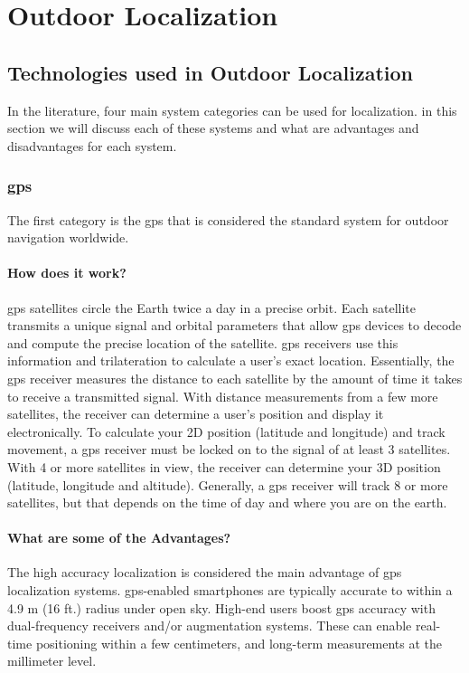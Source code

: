 \chapter{Outdoor Localization}

\section{Technologies used in Outdoor Localization}
In the literature, four main system categories can be used for localization.
in this section we will discuss each of these systems and what are advantages and disadvantages for each system.

\subsection{\ac{gps}}
The first category is the \ac{gps} that is considered the standard system for outdoor navigation worldwide.\cite{6295661}

\subsubsection{How does it work?}
\ac{gps} satellites circle the Earth twice a day in a precise orbit.
Each satellite transmits a unique signal and orbital parameters that allow \ac{gps} devices to decode and compute the precise location of the satellite.
\ac{gps} receivers use this information and trilateration to calculate a user's exact location.
Essentially, the \ac{gps} receiver measures the distance to each satellite by the amount of time it takes to receive a transmitted signal.
With distance measurements from a few more satellites, the receiver can determine a user's position and display it electronically.
To calculate your 2D position (latitude and longitude) and track movement, a \ac{gps} receiver must be locked on to the signal of at least 3 satellites.
With 4 or more satellites in view, the receiver can determine your 3D position (latitude, longitude and altitude).
Generally, a \ac{gps} receiver will track 8 or more satellites, but that depends on the time of day and where you are on the earth.\cite{web:Garmin}

\subsubsection{What are some of the Advantages?}
The high accuracy localization is considered the main advantage of \ac{gps} localization systems.
\ac{gps}-enabled smartphones are typically accurate to within a 4.9 m (16 ft.) radius under open sky.
High-end users boost \ac{gps} accuracy with dual-frequency receivers and/or augmentation systems.
These can enable real-time positioning within a few centimeters, and long-term measurements at the millimeter level.\cite{web:GPS.gov}


